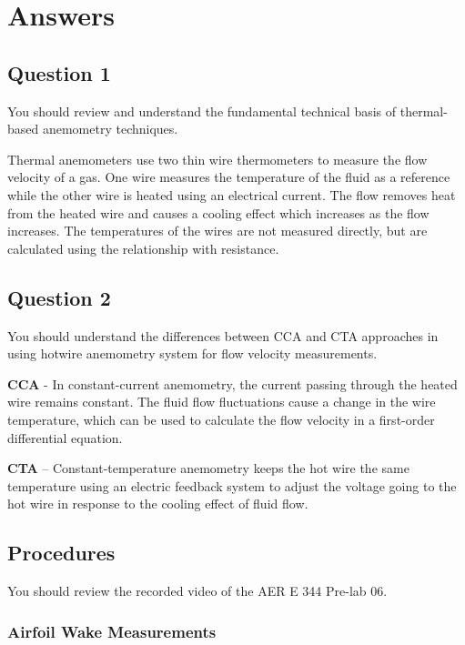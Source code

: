 \chapter{Answers}
\label{cp:answers}
\section{Question 1}
\begin{importantbox}
You should review and understand the fundamental technical basis of thermal-based anemometry techniques.
\end{importantbox}

Thermal anemometers use two thin wire thermometers to measure the flow velocity of a gas. One wire measures the temperature of the fluid as a reference while the other wire is heated using an electrical current. The flow removes heat from the heated wire and causes a cooling effect which increases as the flow increases. The temperatures of the wires are not measured directly, but are calculated using the relationship with resistance.

\section{Question 2}
\begin{importantbox}
You should understand the differences between CCA and CTA approaches in using hotwire anemometry system for flow velocity measurements.
\end{importantbox}

\textbf{CCA} - In constant-current anemometry, the current passing through the heated wire remains constant. The fluid flow fluctuations cause a change in the wire temperature, which can be used to calculate the flow velocity in a first-order differential equation.  

\textbf{CTA} – Constant-temperature anemometry keeps the hot wire the same temperature using an electric feedback system to adjust the voltage going to the hot wire in response to the cooling effect of fluid flow.  

\section{Procedures}
\begin{importantbox}
You should review the recorded video of the AER E 344 Pre-lab 06.
\end{importantbox}

\subsection{Airfoil Wake Measurements}


